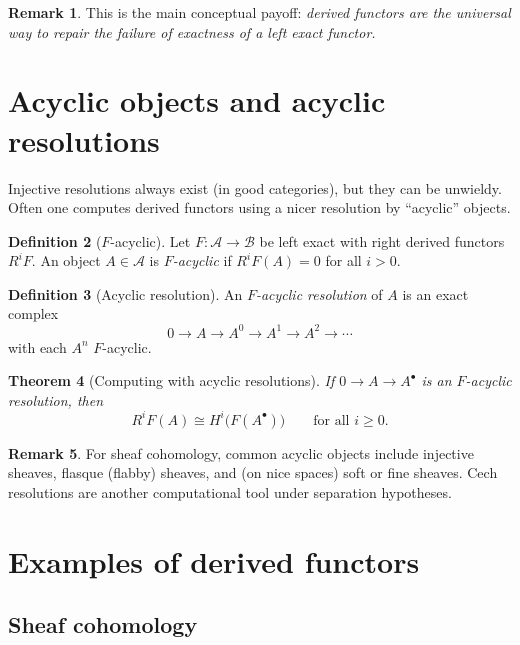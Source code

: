 \documentclass[11pt]{article}
\theoremstyle{definition}
\newtheorem{definition}{Definition}[section]
\newtheorem{remark}[definition]{Remark}
\theoremstyle{plain}
\newtheorem{theorem}[definition]{Theorem}
\begin{document}
\begin{remark}
This is the main conceptual payoff: \emph{derived functors are the universal way to repair the failure of exactness of a left exact functor.}
\end{remark}

\section{Acyclic objects and acyclic resolutions}

Injective resolutions always exist (in good categories), but they can be unwieldy. Often one computes derived functors using a nicer resolution by ``acyclic'' objects.

\begin{definition}[$F$-acyclic]\label{def:acyclic}
Let $F:\mathcal{A}\to\mathcal{B}$ be left exact with right derived functors $R^iF$.
An object $A\in\mathcal{A}$ is \emph{$F$-acyclic} if $R^iF(A)=0$ for all $i>0$.
\end{definition}

\begin{definition}[Acyclic resolution]\label{def:acyclic-resolution}
An \emph{$F$-acyclic resolution} of $A$ is an exact complex
\[
0\to A\to A^0\to A^1\to A^2\to \cdots
\]
with each $A^n$ $F$-acyclic.
\end{definition}

\begin{theorem}[Computing with acyclic resolutions]\label{thm:acyclic-computation}
If $0\to A\to A^\bullet$ is an $F$-acyclic resolution, then
\[
R^iF(A)\cong H^i\bigl(F(A^\bullet)\bigr)\qquad \text{for all } i\ge 0.
\]
\end{theorem}

\begin{remark}
For sheaf cohomology, common acyclic objects include injective sheaves, flasque (flabby) sheaves, and (on nice spaces) soft or fine sheaves. Cech resolutions are another computational tool under separation hypotheses.
\end{remark}

\section{Examples of derived functors}

\subsection{Sheaf cohomology}
\end{document}
